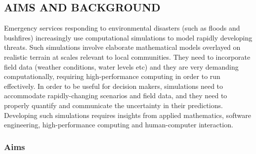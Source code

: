 \subsection*{AIMS AND BACKGROUND}

Emergency services responding to environmental disasters (such as
floods and bushfires) increasingly use computational simulations
to model rapidly developing threats. Such simulations involve elaborate mathematical models
overlayed on realistic terrain at scales relevant to local
communities. They need to incorporate field data (weather conditions,
water levels etc) and they are very demanding computationally,
requiring high-performance computing in order to run effectively. In
order to be useful for decision makers, simulations need to
accommodate rapidly-changing scenarios and field data, and they need
to properly quantify and communicate the uncertainty in
their predictions. Developing such simulations requires insights from
applied mathematics, software engineering, high-performance computing
and human-computer interaction.

\iffalse
When systems are disrupted during environmental disasters (for example,
during floods, storm surges or tsunamis) information from
computational simulation is needed urgently to aid decision-making by
emergency services. This is not simply a matter of compute power but
requires insight from applied mathematics, software
engineering, human computer interaction, high performance computing
and data visualisation. All of these facets need to be tightly coupled
and {\bf tested in realistic  decision-making
scenarios} where decision makers collaborate with modelling experts. In
particular, a crucial aspect of advice provided from modellers to
decision makers is to {\bf properly quantify and communicate the
{uncertainty}} in predictions obtained by computer simulations.
This advice needs to be provided in a timely manner and in a context
where the computer support may vary dramatically due to
system outages.
\fi

\subsubsection*{Aims}

